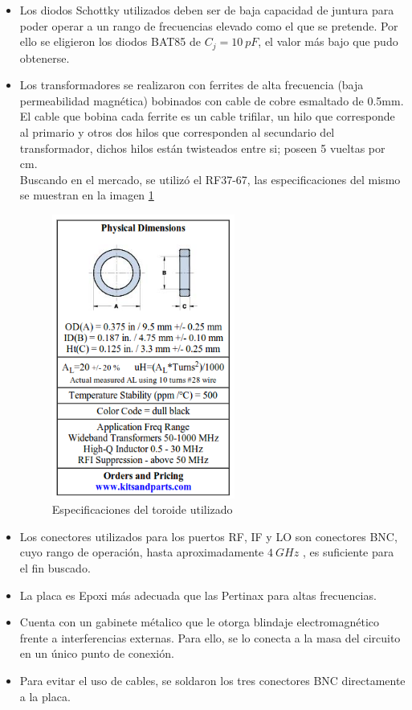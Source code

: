 \documentclass[a4paper,10pt]{article}
\begin{document}
	\begin{itemize}
		\item Los diodos Schottky utilizados deben ser de baja capacidad de 
		juntura para poder operar a un rango de frecuencias elevado como el que 
		se pretende. Por ello se eligieron los diodos BAT85 de $C_j=10~pF$, el 
		valor m\'as bajo que pudo obtenerse. 
		\item Los transformadores se realizaron con ferrites de alta frecuencia 
		(baja permeabilidad magnética) bobinados con cable de cobre esmaltado de
		0.5mm. El cable que bobina cada ferrite es un cable trifilar, un hilo 
		que corresponde al primario y otros dos hilos que corresponden al 
		secundario del transformador, dichos hilos están twisteados entre si; 
		poseen 5 vueltas por cm. \\
		\indent Buscando en el mercado, se utilizó el RF37-67, las 
		especificaciones del mismo se muestran en la imagen \ref{SpecToroid}

		\begin{figure}[!htb]
			\centering
			\includegraphics[width=6cm]{Images/specToroid.png}
			\caption{Especificaciones del toroide utilizado}
			\label{SpecToroid}
		\end{figure}

		\item Los conectores utilizados para los puertos RF, IF y LO son 
		conectores BNC, cuyo rango de operaci\'on, hasta aproximadamente $4~GHz$
		, es suficiente para el fin buscado.
		\item La placa es Epoxi m\'as adecuada que las Pertinax para altas 
		frecuencias.
		\item Cuenta con un gabinete m\'etalico que le otorga blindaje 
		electromagn\'etico frente a interferencias externas. Para ello, se lo 
		conecta a la masa del circuito en un único punto de conexión.
		\item Para evitar el uso de cables, se soldaron los tres conectores BNC
		directamente a la placa.
	\end{itemize}
	 
\end{document}
